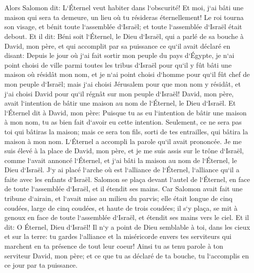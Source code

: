 \chapter{}

\verse Alors Salomon dit: L`Éternel veut habiter dans l`obscurité! 
\verse Et moi, j`ai bâti une maison qui sera ta demeure, un lieu où tu résideras éternellement! 
\verse Le roi tourna son visage, et bénit toute l`assemblée d`Israël; et toute l`assemblée d`Israël était debout. 
\verse Et il dit: Béni soit l`Éternel, le Dieu d`Israël, qui a parlé de sa bouche à David, mon père, et qui accomplit par sa puissance ce qu`il avait déclaré en disant: 
\verse Depuis le jour où j`ai fait sortir mon peuple du pays d`Égypte, je n`ai point choisi de ville parmi toutes les tribus d`Israël pour qu`il y fût bâti une maison où résidât mon nom, et je n`ai point choisi d`homme pour qu`il fût chef de mon peuple d`Israël; 
\verse mais j`ai choisi Jérusalem pour que mon nom y résidât, et j`ai choisi David pour qu`il régnât sur mon peuple d`Israël! 
\verse David, mon père, avait l`intention de bâtir une maison au nom de l`Éternel, le Dieu d`Israël. 
\verse Et l`Éternel dit à David, mon père: Puisque tu as eu l`intention de bâtir une maison à mon nom, tu as bien fait d`avoir eu cette intention. 
\verse Seulement, ce ne sera pas toi qui bâtiras la maison; mais ce sera ton fils, sorti de tes entrailles, qui bâtira la maison à mon nom. 
\verse L`Éternel a accompli la parole qu`il avait prononcée. Je me suis élevé à la place de David, mon père, et je me suis assis sur le trône d`Israël, comme l`avait annoncé l`Éternel, et j`ai bâti la maison au nom de l`Éternel, le Dieu d`Israël. 
\verse J`y ai placé l`arche où est l`alliance de l`Éternel, l`alliance qu`il a faite avec les enfants d`Israël. 
\verse Salomon se plaça devant l`autel de l`Éternel, en face de toute l`assemblée d`Israël, et il étendit ses mains. 
\verse Car Salomon avait fait une tribune d`airain, et l`avait mise au milieu du parvis; elle était longue de cinq coudées, large de cinq coudées, et haute de trois coudées; il s`y plaça, se mit à genoux en face de toute l`assemblée d`Israël, et étendit ses mains vers le ciel. Et il dit: 
\verse O Éternel, Dieu d`Israël! Il n`y a point de Dieu semblable à toi, dans les cieux et sur la terre: tu gardes l`alliance et la miséricorde envers tes serviteurs qui marchent en ta présence de tout leur coeur! 
\verse Ainsi tu as tenu parole à ton serviteur David, mon père; et ce que tu as déclaré de ta bouche, tu l`accomplis en ce jour par ta puissance. 
